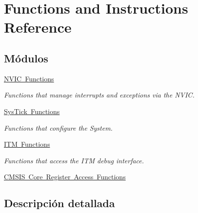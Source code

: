 \hypertarget{group___c_m_s_i_s___core___function_interface}{}\section{Functions and Instructions Reference}
\label{group___c_m_s_i_s___core___function_interface}
\subsection*{Módulos}
\begin{DoxyCompactItemize}
\item 
\mbox{\hyperlink{group___c_m_s_i_s___core___n_v_i_c_functions}{N\+V\+I\+C Functions}}
\begin{DoxyCompactList}\small\item\em Functions that manage interrupts and exceptions via the N\+V\+IC. \end{DoxyCompactList}\item 
\mbox{\hyperlink{group___c_m_s_i_s___core___sys_tick_functions}{Sys\+Tick Functions}}
\begin{DoxyCompactList}\small\item\em Functions that configure the System. \end{DoxyCompactList}\item 
\mbox{\hyperlink{group___c_m_s_i_s__core___debug_functions}{I\+T\+M Functions}}
\begin{DoxyCompactList}\small\item\em Functions that access the I\+TM debug interface. \end{DoxyCompactList}\item 
\mbox{\hyperlink{group___c_m_s_i_s___core___reg_acc_functions}{C\+M\+S\+I\+S Core Register Access Functions}}
\end{DoxyCompactItemize}


\subsection{Descripción detallada}

